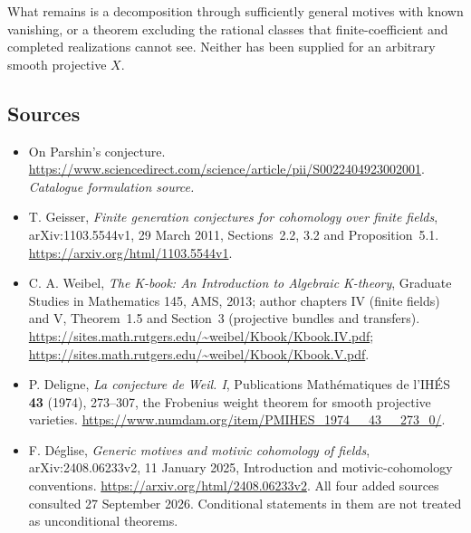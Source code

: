 \documentclass[11pt,a4paper]{article}
\numberwithin{equation}{section}
\begin{document}
What remains is a decomposition through sufficiently general motives
with known vanishing, or a theorem excluding the rational classes that
finite-coefficient and completed realizations cannot see. Neither has
been supplied for an arbitrary smooth projective $X$.
\subsection{Sources}
\begin{itemize}\raggedright
\item[\textnormal{[S1]}]\hypertarget{source:7200016:1}{} On Parshin's conjecture.
\url{https://www.sciencedirect.com/science/article/pii/S0022404923002001}.
{\small\textit{Catalogue formulation source.}}
\item[\textnormal{[E1]}]\hypertarget{extra:7200016:1}{}
T. Geisser, \emph{Finite generation conjectures for cohomology over finite
fields}, arXiv:1103.5544v1, 29 March 2011, Sections~2.2, 3.2 and
Proposition~5.1. \url{https://arxiv.org/html/1103.5544v1}.
\item[\textnormal{[E2]}]\hypertarget{extra:7200016:2}{}
C. A. Weibel, \emph{The K-book: An Introduction to Algebraic K-theory},
Graduate Studies in Mathematics 145, AMS, 2013; author chapters IV
(finite fields) and V, Theorem~1.5 and Section~3 (projective bundles and
transfers). \url{https://sites.math.rutgers.edu/~weibel/Kbook/Kbook.IV.pdf};
\url{https://sites.math.rutgers.edu/~weibel/Kbook/Kbook.V.pdf}.
\item[\textnormal{[E3]}]\hypertarget{extra:7200016:3}{}
P. Deligne, \emph{La conjecture de Weil. I}, Publications Math\'ematiques
de l'IH\'ES \textbf{43} (1974), 273--307, the Frobenius weight theorem
for smooth projective varieties.
\url{https://www.numdam.org/item/PMIHES_1974__43__273_0/}.
\item[\textnormal{[E4]}]\hypertarget{extra:7200016:4}{}
F. D\'eglise, \emph{Generic motives and motivic cohomology of fields},
arXiv:2408.06233v2, 11 January 2025, Introduction and motivic-cohomology
conventions. \url{https://arxiv.org/html/2408.06233v2}.
All four added sources consulted 27 September 2026. Conditional statements
in them are not treated as unconditional theorems.
\end{itemize}
\end{document}
